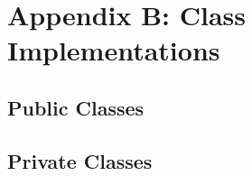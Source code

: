 \documentclass[]{article}
\begin{document}
\section*{Appendix B:  Class Implementations}

\subsection{Public Classes}









\subsection{Private Classes}




\end{document}
